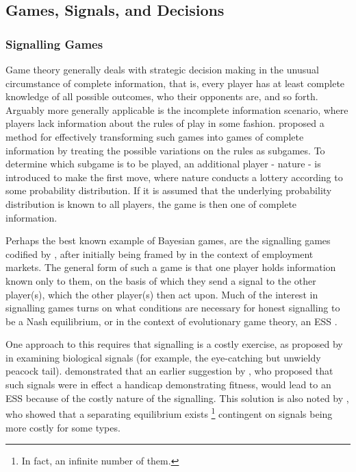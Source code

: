 \subsection{Games, Signals, and Decisions}
\label{sub:games_signals}




\subsubsection{Signalling Games}



Game theory generally deals with strategic decision making in the
unusual circumstance of complete information, that is, every player
has at least complete knowledge of all possible outcomes, who their
opponents are, and so forth. Arguably more generally applicable is
the incomplete information scenario, where players lack information
about the rules of play in some fashion. \citet{Harsanyi1967} proposed
a method for effectively transforming such games into games of complete
information by treating the possible variations on the rules as subgames.
To determine which subgame is to be played, an additional player -
nature - is introduced to make the first move, where nature conducts
a lottery according to some probability distribution. If it is assumed
that the underlying probability distribution is known to all players,
the game is then one of complete information. 

Perhaps the best known example of Bayesian games, are the signalling
games codified by \citet{Kreps1987}, after initially being framed
by \citet{Spence1973} in the context of employment markets. The general
form of such a game is that one player holds information known only
to them, on the basis of which they send a signal to the other player(s),
which the other player(s) then act upon. Much of the interest in signalling
games turns on what conditions are necessary for honest signalling
to be a Nash equilibrium, or in the context of evolutionary game theory,
an \ac{ESS} . 

One approach to this requires that signalling is a costly exercise,
as proposed by \citet{Grafen1990} in examining biological signals
(for example, the eye-catching but unwieldy peacock tail). \citeauthor{Grafen1990}
demonstrated that an earlier suggestion by \citet{Zahavi1975}, who
proposed that such signals were in effect a handicap demonstrating
fitness, would lead to an \ac{ESS} because of the costly nature of
the signalling. This solution is also noted by \citet{Spence1973},
who showed that a separating equilibrium exists%
\footnote{In fact, an infinite number of them.%
} contingent on signals being more costly for some types.

